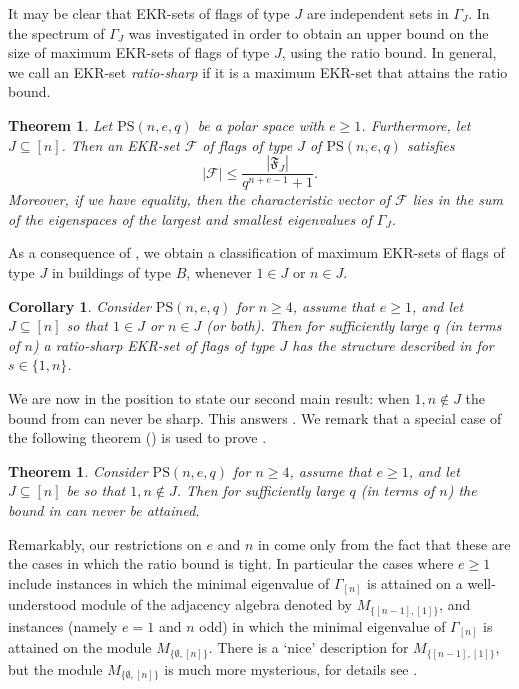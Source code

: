 \documentclass[11pt]{article}
\newtheorem{theorem}[thm]{Theorem}
\newtheorem{cor}[thm]{Corollary}
\newcommand{\EKR}{\mathcal{F}}
\newcommand{\PS}{\mathrm{PS}}
\newcommand{\cF}{\mathfrak{F}}
\renewcommand{\leq}{\leqslant}
\renewcommand{\ge}{\geqslant}
\renewcommand{\geq}{\geqslant}
\begin{document}
It may be clear that EKR-sets of flags of type $J$ are independent sets in $\Gamma_J$. In \cite{AlgebraicApproach} the spectrum of $\Gamma_J$ was investigated in order to obtain an upper bound on the size of maximum EKR-sets of flags of type $J$, using the ratio bound. In general, we call an EKR-set \emph{ratio-sharp} if it is a maximum EKR-set that attains the ratio bound. 

\begin{theorem}\cite[Theorem 3.15]{AlgebraicApproach}\label{thm:upperbound}
Let $\PS(n,e,q)$ be a polar space with $e \geq 1$. %
Furthermore, let $J\subseteq[n]$.
Then an EKR-set $\EKR$ of flags of type $J$ of $\PS(n,e,q)$ satisfies
    \[|\EKR| \leq \frac{|\cF_J|}{q^{n+e-1}+1}.\]
    Moreover, if we have equality, then the characteristic vector of $\EKR$ lies in the sum of the eigenspaces of the largest and smallest eigenvalues of $\Gamma_J$.
\end{theorem}

As a consequence of , we obtain a classification of maximum EKR-sets of flags of type $J$ in buildings of type $B$, whenever $1 \in J$ or $n \in J$.

\begin{cor} \label{C: classification for flags}
    Consider $\PS(n,e,q)$ for $n\geq 4$, assume that $e \geq 1$, and let $J \subseteq [n]$ so that $1 \in J$ or $n \in J$ (or both). Then for sufficiently large $q$ (in terms of $n$) a ratio-sharp EKR-set of flags of type $J$ has the structure described in 
     for $s\in \{1,n\}$.
\end{cor}

We are now in the position to state our second main result: when $1,n \notin J$ the bound from  can never be sharp. This answers \cite[Problem 3.20]{AlgebraicApproach}. We remark that a special case of the following theorem () is used to prove .

\begin{theorem}\label{thm:main2}
    Consider $\PS(n,e,q)$ for $n\geq 4$, assume that $e\ge 1$, and let $J \subseteq [n]$ be so that $1,n \notin J$. Then for sufficiently large $q$ (in terms of $n$) the bound in  can never be attained.
\end{theorem}

Remarkably, our restrictions on $e$ and $n$ in  come only from the fact that these are the cases in which the ratio bound is tight. In particular the cases where $e\ge 1$ include instances in which the minimal eigenvalue of $\Gamma_{[n]}$ is attained on a well-understood module of the adjacency algebra denoted by $M_{\{[n-1],[1]\}}$, and instances (namely $e=1$ and $n$ odd) in which the minimal eigenvalue of $\Gamma_{[n]}$ is attained on the module $M_{\{\emptyset,[n]\}}$. There is a `nice' description for $M_{\{[n-1],[1]\}}$, but the module $M_{\{\emptyset,[n]\}}$ is much more mysterious, for details see \cite{AlgebraicApproach2}. \\
\end{document}
